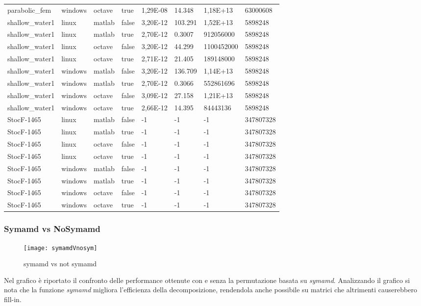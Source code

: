 \begin{small}
\begin{longtable}{|l|l|l|l|l|l|l|l|}
parabolic\_fem  & windows & octave & true  & 1,29E-08   & 14.348   & 1,18E+13   & 63000608   \\
shallow\_water1 & linux   & matlab & false & 3,20E-12   & 103.291  & 1,52E+13   & 5898248    \\
shallow\_water1 & linux   & matlab & true  & 2,70E-12   & 0.3007   & 912056000  & 5898248    \\
shallow\_water1 & linux   & octave & false & 3,20E-12   & 44.299   & 1100452000 & 5898248    \\
shallow\_water1 & linux   & octave & true  & 2,71E-12   & 21.405   & 189148000  & 5898248    \\
shallow\_water1 & windows & matlab & false & 3,20E-12   & 136.709  & 1,14E+13   & 5898248    \\
shallow\_water1 & windows & matlab & true  & 2,70E-12   & 0.3066   & 552861696  & 5898248    \\
shallow\_water1 & windows & octave & false & 3,09E-12   & 27.158   & 1,21E+13   & 5898248    \\
shallow\_water1 & windows & octave & true  & 2,66E-12   & 14.395   & 84443136   & 5898248    \\
StocF-1465      & linux   & matlab & false & -1         & -1       & -1         & 347807328  \\
StocF-1465      & linux   & matlab & true  & -1         & -1       & -1         & 347807328  \\
StocF-1465      & linux   & octave & false & -1         & -1       & -1         & 347807328  \\
StocF-1465      & linux   & octave & true  & -1         & -1       & -1         & 347807328  \\
StocF-1465      & windows & matlab & false & -1         & -1       & -1         & 347807328  \\
StocF-1465      & windows & matlab & true  & -1         & -1       & -1         & 347807328  \\
StocF-1465      & windows & octave & false & -1         & -1       & -1         & 347807328  \\
StocF-1465      & windows & octave & true  & -1         & -1       & -1         & 347807328  \\
\hline

\end{longtable}
\end{small}
\subsubsection{Symamd vs NoSymamd}\label{symamdVSnotsymamd}
\begin{figure}[H]
\texttt{[image: symamdVnosym]}\centering
\caption{symamd vs not symamd}\label{fig:sym}
\end{figure}
Nel grafico è riportato il confronto delle performance ottenute con e senza la permutazione basata su \emph{symamd}.
Analizzando il grafico si nota che la funzione \emph{symamd} migliora l'efficienza della decomposizione, rendendola anche possibile su matrici che altrimenti causerebbero fill-in.

